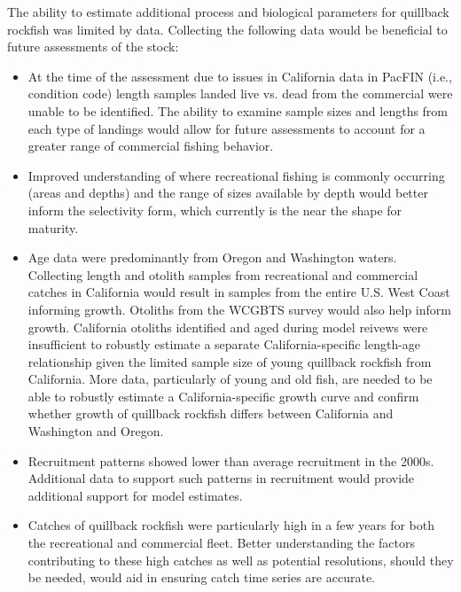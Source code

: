 \documentclass[11pt,
  english,
  letterpaper,
]{article}
\begin{document}

The ability to estimate additional process and biological parameters for quillback rockfish was limited by data. Collecting the following data would be beneficial to future assessments of the stock:

\leavevmode\tagmcend\tagstructend\par

\begin{itemize}

  \item At the time of the assessment due to issues in California data in PacFIN (i.e., condition code) length samples landed live vs. dead from the commercial were unable to be identified. The ability to examine sample sizes and lengths from each type of landings would allow for future assessments to account for a greater range of commercial fishing behavior.
  
  \item Improved understanding of where recreational fishing is commonly occurring (areas and depths) and the range of sizes available by depth would better inform the selectivity form, which currently is the near the shape for maturity.  

    \item Age data were predominantly from Oregon and Washington waters. Collecting length and otolith samples from recreational and commercial catches in California would result in samples from the entire U.S. West Coast informing growth. Otoliths from the WCGBTS survey would also help inform growth. California otoliths identified and aged during model reivews were insufficient to robustly estimate a separate California-specific length-age relationship given the limited sample size of young quillback rockfish from California. More data, particularly of young and old fish, are needed to be able to robustly estimate a California-specific growth curve and confirm whether growth of quillback rockfish differs between California and Washington and Oregon. 
    
    \item Recruitment patterns showed lower than average recruitment in the 2000s. Additional data to support such patterns in recruitment would provide additional support for model estimates. 
    
    \item Catches of quillback rockfish were particularly high in a few years for both the recreational and commercial fleet. Better understanding the factors contributing to these high catches as well as potential resolutions, should they be needed, would aid in ensuring catch time series are accurate.  
    
\end{itemize}
\end{document}
